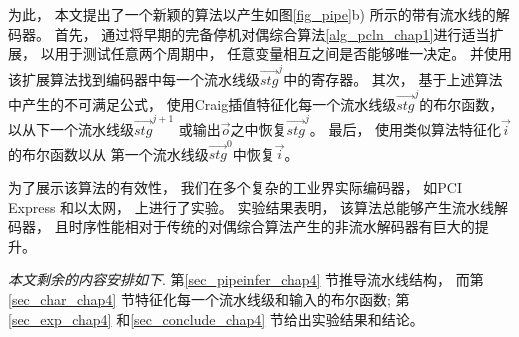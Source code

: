 为此，
本文提出了一个新颖的算法以产生如图\ref{fig_pipe}b) 所示的带有流水线的解码器。
首先，
通过将早期的完备停机对偶综合算法\ref{alg_pcln_chap1}进行适当扩展，
以用于测试任意两个周期中，
任意变量相互之间是否能够唯一决定。
并使用该扩展算法找到编码器中每一个流水线级$\vec{stg}^j$中的寄存器。
其次，
基于上述算法中产生的不可满足公式，
使用Craig插值特征化每一个流水线级$\vec{stg}^j$的布尔函数，
以从下一个流水线级$\vec{stg}^{j+1}$ 或输出$\vec{o}$之中恢复$\vec{stg}^j$。
最后，
使用类似算法特征化$\vec{i}$的布尔函数以从
第一个流水线级$\vec{stg}^0$中恢复$\vec{i}$。


为了展示该算法的有效性，
我们在多个复杂的工业界实际编码器，
如PCI Express  和以太网，
上进行了实验。
实验结果表明，
该算法总能够产生流水线解码器，
且时序性能相对于传统的对偶综合算法产生的非流水解码器有巨大的提升。


\emph{本文剩余的内容安排如下}.
第\ref{sec_pipeinfer_chap4} 节推导流水线结构，
而第\ref{sec_char_chap4} 节特征化每一个流水线级和输入的布尔函数;
第\ref{sec_exp_chap4} 和\ref{sec_conclude_chap4} 节给出实验结果和结论。


